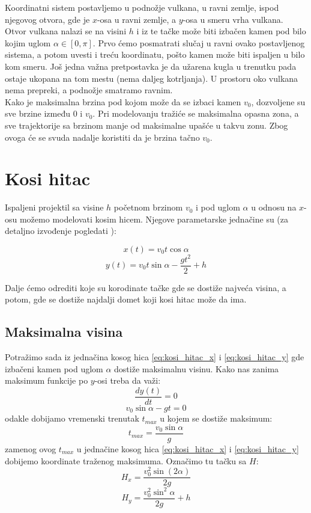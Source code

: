 \documentclass[a4paper]{article}
\begin{document}
Koordinatni sistem postavljemo u podnožje vulkana, u ravni zemlje, ispod njegovog otvora,
gde je $x$-osa u ravni zemlje, a $y$-osa u smeru vrha vulkana.
Otvor vulkana nalazi se na visini $h$ i iz te tačke može biti izbačen kamen pod bilo
kojim uglom $\alpha \in [0, \pi]$. Prvo ćemo posmatrati slučaj u ravni ovako postavljenog 
sistema, a potom uvesti i treću koordinatu, pošto kamen može biti ispaljen u bilo kom smeru. Još jedna važna pretpostavka je da užarena kugla u trenutku pada ostaje ukopana
na tom mestu (nema daljeg kotrljanja). U prostoru oko vulkana nema prepreki, a podnožje
smatramo ravnim. \\

Kako je maksimalna brzina pod kojom može da se izbaci kamen $v_0$, dozvoljene su sve brzine
između 0 i $v_0$. Pri modelovanju tražiće se maksimalna opasna zona, a 
sve trajektorije sa brzinom manje od maksimalne upašće u takvu zonu. Zbog ovoga će se svuda
nadalje koristiti da je brzina tačno $v_0$.

\section{Kosi hitac}
\label{sec:kosi_hitac}
Ispaljeni projektil sa visine $h$ početnom brzinom $v_0$ i pod uglom $\alpha$ u 
odnosu na $x$-osu možemo modelovati kosim hicem. Njegove parametarske jednačine su 
(za detaljno izvođenje pogledati \cite{Drazic}):

\begin{equation}
\label{eq:kosi_hitac_x}
x(t) = v_0 t \cos \alpha
\end{equation}
\begin{equation}
\label{eq:kosi_hitac_y}
y(t) = v_0 t \sin \alpha - \frac{gt^2}{2} + h
\end{equation}

Dalje ćemo odrediti koje su korodinate tačke gde se dostiže najveća visina, a potom,
gde se dostiže najdalji domet koji kosi hitac može da ima.


\subsection{Maksimalna visina}
\label{sec:max_visina}
Potražimo sada iz jednačina kosog hica \ref{eq:kosi_hitac_x} i \ref{eq:kosi_hitac_y}
gde izbačeni kamen pod uglom $\alpha$ dostiže maksimalnu visinu. Kako nas zanima 
maksimum funkcije po $y$-osi treba da važi:
$$ \frac{dy(t)}{dt} = 0 $$ 
$$ v_0 \sin \alpha - gt = 0 $$
odakle dobijamo vremenski trenutak $t_{max}$ u kojem se dostiže maksimum:
$$ t_{max} = \frac{v_0 \sin \alpha}{g} $$
zamenog ovog $t_{max}$ u jednačine kosog hica \ref{eq:kosi_hitac_x} i \ref{eq:kosi_hitac_y}
dobijemo koordinate traženog maksimuma. Označimo tu tačku sa $H$:
\begin{equation}
\label{eq:Hx}
H_{x} = \frac{v_0^2 \sin(2 \alpha)}{2g}
\end{equation}
\begin{equation}
\label{eq:Hy}
H_{y} = \frac{v_0^2 \sin^2 \alpha}{2g} + h
\end{equation}
\end{document}
